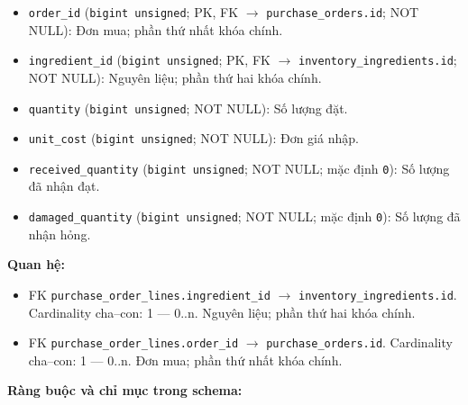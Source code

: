 \begin{itemize}

\item \texttt{order\_id} (\texttt{bigint unsigned}; PK, FK $\rightarrow$ \texttt{purchase\_orders.id}; NOT NULL): Đơn mua; phần thứ nhất khóa chính.

\item \texttt{ingredient\_id} (\texttt{bigint unsigned}; PK, FK $\rightarrow$ \texttt{inventory\_ingredients.id}; NOT NULL): Nguyên liệu; phần thứ hai khóa chính.

\item \texttt{quantity} (\texttt{bigint unsigned}; NOT NULL): Số lượng đặt.

\item \texttt{unit\_cost} (\texttt{bigint unsigned}; NOT NULL): Đơn giá nhập.

\item \texttt{received\_quantity} (\texttt{bigint unsigned}; NOT NULL; mặc định \texttt{0}): Số lượng đã nhận đạt.

\item \texttt{damaged\_quantity} (\texttt{bigint unsigned}; NOT NULL; mặc định \texttt{0}): Số lượng đã nhận hỏng.

\end{itemize}

\textbf{Quan hệ:}

\begin{itemize}

\item FK \texttt{purchase\_order\_lines.ingredient\_id} $\rightarrow$ \texttt{inventory\_ingredients.id}. Cardinality cha--con: 1 — 0..n. Nguyên liệu; phần thứ hai khóa chính.

\item FK \texttt{purchase\_order\_lines.order\_id} $\rightarrow$ \texttt{purchase\_orders.id}. Cardinality cha--con: 1 — 0..n. Đơn mua; phần thứ nhất khóa chính.

\end{itemize}

\textbf{Ràng buộc và chỉ mục trong schema:}

